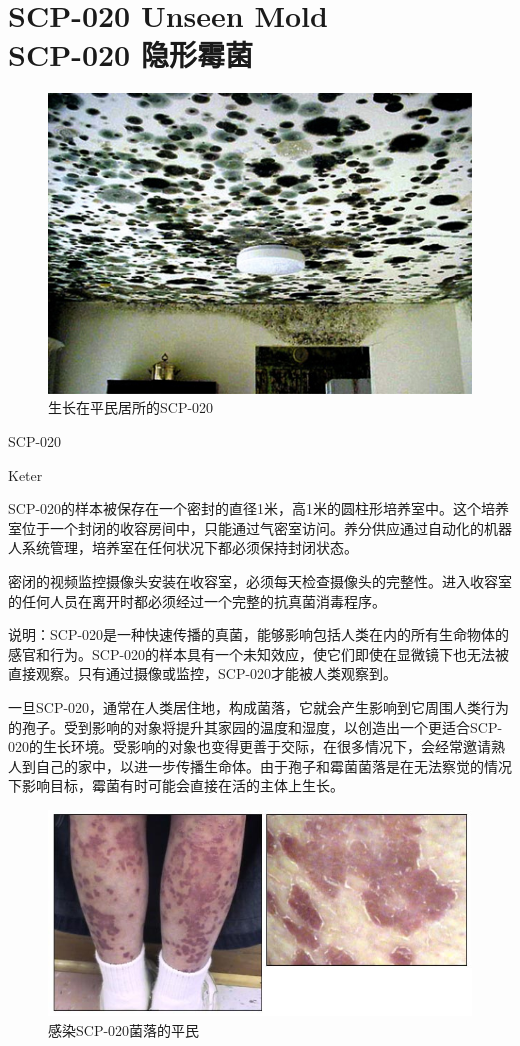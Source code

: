 \chapter[SCP-020 隐形霉菌]{
    SCP-020 Unseen Mold\\
    SCP-020 隐形霉菌
}

\label{chap:SCP-020}

\begin{figure}[H]
    \centering
    \includegraphics[width=0.5\linewidth]{images/SCP.020.jpg}
    \caption*{生长在平民居所的SCP-020}
\end{figure}

 SCP-020

 Keter

 SCP-020的样本被保存在一个密封的直径1米，高1米的圆柱形培养室中。这个培养室位于一个封闭的收容房间中，只能通过气密室访问。养分供应通过自动化的机器人系统管理，培养室在任何状况下都必须保持封闭状态。

密闭的视频监控摄像头安装在收容室，必须每天检查摄像头的完整性。进入收容室的任何人员在离开时都必须经过一个完整的抗真菌消毒程序。

 说明：SCP-020是一种快速传播的真菌，能够影响包括人类在内的所有生命物体的感官和行为。SCP-020的样本具有一个未知效应，使它们即使在显微镜下也无法被直接观察。只有通过摄像或监控，SCP-020才能被人类观察到。

一旦SCP-020，通常在人类居住地，构成菌落，它就会产生影响到它周围人类行为的孢子。受到影响的对象将提升其家园的温度和湿度，以创造出一个更适合SCP-020的生长环境。受影响的对象也变得更善于交际，在很多情况下，会经常邀请熟人到自己的家中，以进一步传播生命体。由于孢子和霉菌菌落是在无法察觉的情况下影响目标，霉菌有时可能会直接在活的主体上生长。

\begin{figure}[H]
    \centering
    \includegraphics[width=0.5\linewidth]{images/SCP.020.2.jpg}
    \caption*{感染SCP-020菌落的平民}
\end{figure}

